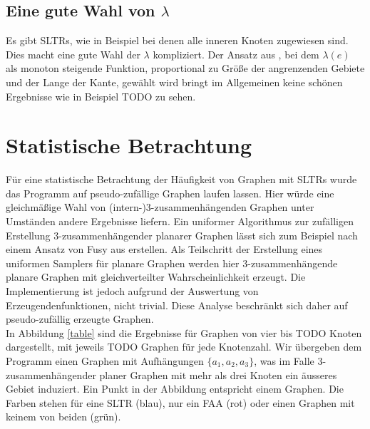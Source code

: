 \subsection{Eine gute Wahl von $\lambda$}

Es gibt SLTRs, wie in Beispiel bei denen alle inneren Knoten zugewiesen sind. Dies macht eine gute Wahl der $\lambda$ kompliziert. Der Ansatz aus \cite{fs17}, bei dem $\lambda(e)$ als monoton steigende Funktion, proportional zu Größe der angrenzenden Gebiete und der Lange der Kante, gewählt wird bringt im Allgemeinen keine schönen Ergebnisse wie in Beispiel TODO zu sehen.

\section{Statistische Betrachtung}

Für eine statistische Betrachtung der Häufigkeit von Graphen mit SLTRs wurde das Programm auf pseudo-zufällige Graphen laufen lassen. Hier würde eine gleichmäßige Wahl von (intern-)3-zusammenhängenden Graphen unter Umständen andere Ergebnisse liefern. Ein uniformer Algorithmus zur zufälligen Erstellung 3-zusammenhängender planarer Graphen lässt sich zum Beispiel nach einem Ansatz von Fusy aus \cite{fusy07} erstellen. Als Teilschritt der Erstellung eines uniformen Samplers für planare Graphen werden hier 3-zusammenhängende planare Graphen mit gleichverteilter Wahrscheinlichkeit erzeugt. Die Implementierung ist jedoch aufgrund der Auswertung von Erzeugendenfunktionen, nicht trivial. Diese Analyse beschränkt sich daher auf pseudo-zufällig erzeugte Graphen. \\

In Abbildung \ref{table} sind die Ergebnisse für Graphen von vier bis TODO Knoten dargestellt, mit jeweils TODO Graphen für jede Knotenzahl. Wir übergeben dem Programm einen Graphen mit Aufhängungen $\{a_1,a_2,a_3\}$, was im Falle 3-zusammenhängender planer Graphen mit mehr als drei Knoten ein äusseres Gebiet induziert. Ein Punkt in der Abbildung entspricht einem Graphen. Die Farben stehen für eine SLTR (blau), nur ein FAA (rot) oder einen Graphen mit keinem von beiden (grün). \\


